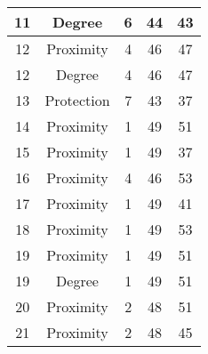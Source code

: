 \documentclass[results.tex]{subfiles}
\begin{document}
\begin{center}
\begin{tabular}{| c || c | c | c | c |}
            \hline
            11                      & Degree                       & 6                      & 44                      & 43                   \\
            \hline
            12                      & Proximity                    & 4                      & 46                      & 47                   \\
            \hline
            12                      & Degree                       & 4                      & 46                      & 47                   \\
            \hline
            13                      & Protection                   & 7                      & 43                      & 37                   \\
            \hline
            14                      & Proximity                    & 1                      & 49                      & 51                   \\
            \hline
            15                      & Proximity                    & 1                      & 49                      & 37                   \\
            \hline
            16                      & Proximity                    & 4                      & 46                      & 53                   \\
            \hline
            17                      & Proximity                    & 1                      & 49                      & 41                   \\
            \hline
            18                      & Proximity                    & 1                      & 49                      & 53                   \\
            \hline
            19                      & Proximity                    & 1                      & 49                      & 51                   \\
            \hline
            19                      & Degree                       & 1                      & 49                      & 51                   \\
            \hline
            20                      & Proximity                    & 2                      & 48                      & 51                   \\
            \hline
            21                      & Proximity                    & 2                      & 48                      & 45                   \\

\end{tabular}
\end{center}
\end{document}
